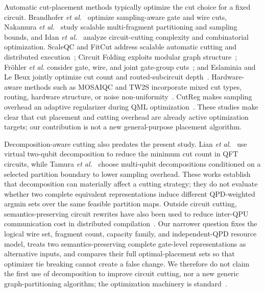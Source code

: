 \documentclass[
  aps,
  pra,
  reprint,
  amsmath,
  amssymb,
  longbibliography,
  nofootinbib,
  floatfix
]{revtex4-2}
\theoremstyle{plain}
\begin{document}
Automatic cut-placement methods typically optimize the cut choice for a fixed circuit. Brandhofer \emph{et al.}~\cite{brandhofer2024} optimize sampling-aware gate and wire cuts, Nakamura \emph{et al.}~\cite{nakamura2025} study scalable multi-fragment partitioning and sampling bounds, and Idan \emph{et al.}~\cite{idan2026} analyze circuit-cutting complexity and combinatorial optimization. ScaleQC and FitCut address scalable automatic cutting and distributed execution~\cite{scaleqc2022,fitcut2024}; Circuit Folding exploits modular graph structure~\cite{circuitfolding2025}; Fr{\"o}hler \emph{et al.} consider gate, wire, and joint gate-group cuts~\cite{frohler2026}; and Eslaminia and Le Beux jointly optimize cut count and routed-subcircuit depth~\cite{eslaminia2026}. Hardware-aware methods such as MOSAIQC and TW2S incorporate mixed cut types, routing, hardware structure, or noise non-uniformity~\cite{mosaiqc2026,tw2s2026,pal2026noise}. CutReg makes sampling overhead an adaptive regularizer during QML optimization~\cite{cutreg2025}. These studies make clear that cut placement and cutting overhead are already active optimization targets; our contribution is not a new general-purpose placement algorithm.

Decomposition-aware cutting also predates the present study. Lian \emph{et al.}~\cite{lian2023hmc} use virtual two-qubit decomposition to reduce the minimum cut count in QFT circuits, while Tamura \emph{et al.}~\cite{tamura2026} choose multi-qubit decompositions conditioned on a selected partition boundary to lower sampling overhead. These works establish that decomposition can materially affect a cutting strategy; they do not evaluate whether two complete equivalent representations induce different QPD-weighted argmin sets over the same feasible partition maps. Outside circuit cutting, semantics-preserving circuit rewrites have also been used to reduce inter-QPU communication cost in distributed compilation~\cite{mengoni2026}. Our narrower question fixes the logical wire set, fragment count, capacity family, and independent-QPD resource model, treats two semantics-preserving complete gate-level representations as alternative inputs, and compares their full optimal-placement sets so that optimizer tie breaking cannot create a false change. We therefore do not claim the first use of decomposition to improve circuit cutting, nor a new generic graph-partitioning algorithm; the optimization machinery is standard~\cite{deza1997,lawler1966,kaibel2008}.

\end{document}
